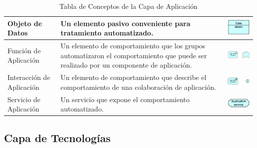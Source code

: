 \begin{table}[H]
\begin{tabular}{| m{4cm} | m{4cm} | m{4cm} | }
		\hline
		\centering\vspace{1.52mm}Objeto de Datos & \vspace{1.52mm}Un elemento pasivo conveniente para tratamiento automatizado.& \vspace{1.52mm}\includegraphics[width=20mm]{arquitectura/imagenes/24} \\
		\hline
		\centering\vspace{1.52mm}Función de Aplicación & \vspace{1.52mm}Un elemento de comportamiento que los grupos automatizaron el comportamiento que puede ser realizado por un componente de aplicación.& \vspace{1.52mm}\includegraphics[width=40mm]{arquitectura/imagenes/25} \\
		\hline
		\centering\vspace{1.52mm}Interacción de Aplicación & \vspace{1.52mm}Un elemento de comportamiento que describe el comportamiento de una colaboración de aplicación.& \vspace{1.52mm}\includegraphics[width=40mm]{arquitectura/imagenes/26} \\
		\hline
		\centering\vspace{1.52mm}Servicio de Aplicación & \vspace{1.52mm}Un servicio que expone el comportamiento automatizado.& \vspace{1.52mm}\includegraphics[width=20mm]{arquitectura/imagenes/27} \\
		\hline
	\end{tabular}
	\caption{Tabla de Conceptos de la Capa de Aplicación}
	\label{fig:aplicacion}
\end{table}

\subsection{Capa de Tecnologías}

